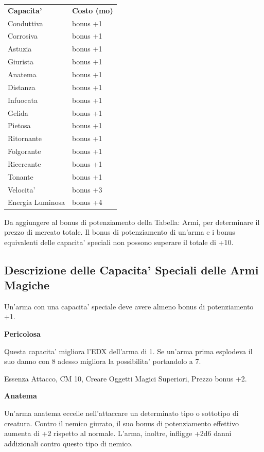\documentclass[a4paper,11pt,twoside,openany]{book}
\begin{document}
{\begin{tabular}{ll}
\toprule
\textbf{Capacita'} & \textbf{Costo (mo)}\tabularnewline
Conduttiva \index{Conduttiva}& bonus +1\tabularnewline
Corrosiva\index{Corrosiva} & bonus +1\tabularnewline
Astuzia \index{Astuzia} & bonus +1\tabularnewline
Giurista\index{Giurista} & bonus +1\tabularnewline
Anatema \index{Anatema} & bonus +1\tabularnewline
Distanza\index{Distanza} & bonus +1\tabularnewline
Infuocata\index{Infuocata} & bonus +1\tabularnewline
Gelida \index{Gelida}& bonus +1\tabularnewline
Pietosa \index{Pietosa}& bonus +1\tabularnewline
Ritornante \index{Ritornante}& bonus +1\tabularnewline
Folgorante\index{Folgorante} & bonus +1\tabularnewline
Ricercante \index{Ricercante} & bonus +1\tabularnewline
Tonante \index{Tonante}& bonus +1\tabularnewline
Velocita' \index{Velocita'} & bonus +3\tabularnewline
Energia Luminosa\index{Energia Luminosa} & bonus +4\tabularnewline

\end{tabular}

\bigskip

Da aggiungere al bonus di potenziamento della Tabella: Armi, per determinare
il prezzo di mercato totale. Il bonus di potenziamento di un'arma
e i bonus equivalenti delle capacita' speciali non possono superare
il totale di +10.

\subsection{Descrizione delle Capacita' Speciali delle Armi Magiche}

\label{descrizione-delle-capacita-speciali-delle-armi-magiche}

Un'arma con una capacita' speciale deve avere almeno bonus di potenziamento +1.

\textbf{Pericolosa}

Questa capacita' migliora l'EDX dell'arma di 1. Se un'arma prima esplodeva il suo danno con 8 adesso migliora la possibilita' portandolo a 7.

Essenza Attacco, CM 10, Creare Oggetti Magici Superiori, Prezzo bonus +2.

\textbf{Anatema}

Un'arma anatema eccelle nell'attaccare un determinato tipo o sottotipo di creatura. Contro il nemico giurato, il suo bonus di potenziamento effettivo aumenta di +2 rispetto al normale. L'arma, inoltre, infligge +2d6 danni addizionali contro questo tipo di nemico. 

}
\end{document}
